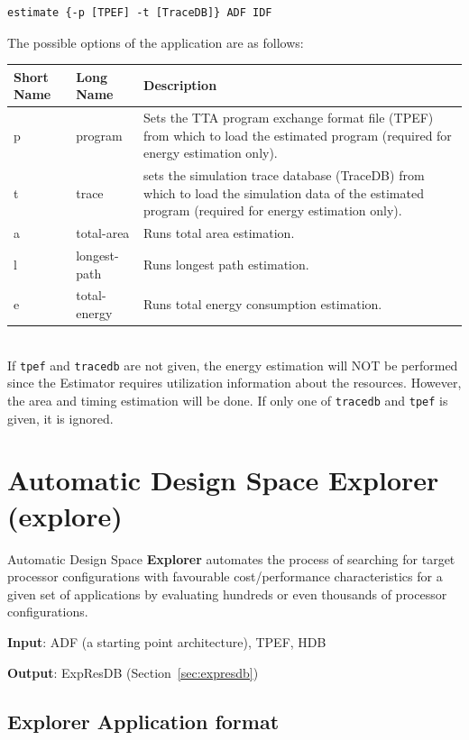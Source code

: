 \documentclass[twoside]{tceusermanual}
\begin{document}
\begin{verbatim}
estimate {-p [TPEF] -t [TraceDB]} ADF IDF
\end{verbatim}

The possible options of the application are as follows:\\

\begin{tabular}{p{}p{}
                p{}}
\textbf{Short Name} &\textbf{Long Name} &\textbf{Description} \\
\hline
p & program & Sets the TTA program exchange format file (TPEF) from which to
load the estimated program (required for energy estimation only). \\
t & trace & sets the simulation trace database (TraceDB) from which to load
the simulation data of the estimated program (required for energy estimation
only). \\
a & total-area & Runs total area estimation.\\
l & longest-path & Runs longest path estimation.\\
e & total-energy & Runs total energy consumption estimation.\\
\end{tabular}\\

If \verb|tpef| and \verb|tracedb| are not given, the energy estimation
will NOT be performed since the Estimator requires utilization
information about the resources. However, the area and timing
estimation will be done. If only one of \verb|tracedb| and \verb|tpef|
is given, it is ignored.

\section{Automatic Design Space Explorer (explore)}
\label{section:explore}

Automatic Design Space \textbf{Explorer} automates the
process of searching for target processor configurations with favourable
cost/performance characteristics for a given set of applications by
evaluating hundreds or even thousands of processor configurations.

\textbf{Input}: ADF (a starting point architecture), TPEF, HDB

\textbf{Output}: ExpResDB (Section~\ref{sec:expresdb})

\subsection{Explorer Application format}
\end{document}
